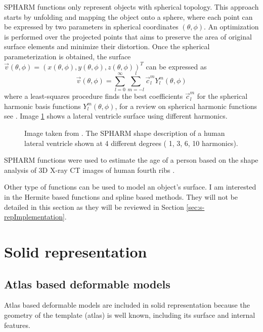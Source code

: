SPHARM functions only represent objects with spherical topology. 
This approach starts by unfolding and mapping the object onto a sphere, where each 
point can be expressed by two parameters in spherical coordinates $(\theta, \phi)$. 
An optimization is performed over the projected points that aims to preserve the area of original
surface elements and minimize their distortion. 
Once the spherical parameterization is obtained, 
the surface $\vec{v}(\theta, \phi) = (x(\theta, \phi), y(\theta, \phi), z(\theta, \phi))^T$
can be expressed as
\begin{equation}
 \vec{v}(\theta, \phi) = \sum_{l=0}^\infty \sum_{m=-l}^l \vec{c}_l^m Y_l^m(\theta, \phi)
 \label{equ:sphericalHarmonics}
\end{equation}
where a least-squares procedure 
finds the best coefficients $\vec{c}_l^m$ for the spherical harmonic basis functions $Y_l^m(\theta, \phi)$, 
for a review on spherical harmonic functions see \cite{mohlenkamp2010user}.
Image \ref{fig:spharm} shows a lateral ventricle surface using different harmonics.

\begin{figure} 
 \centering 
 \caption[SPHARM description.]{Image taken from \cite{styner2004boundary}. The SPHARM shape description of a human lateral ventricle 
	  shown at 4 different degrees ( 1, 3, 6, 10 harmonics).
}
 \label{fig:spharm}  
\end{figure}

SPHARM functions were used to estimate the age of a person based on the 
shape analysis of 3D X-ray CT images of human fourth ribs \cite{PRIET-12d}.

Other type of functions can be used to model an object's surface. I am interested in 
the Hermite based functions and spline based methods. They will not be detailed in this section
as they will be reviewed in Section \ref{sec:s-repImplementation}.


\section{Solid representation}
\label{sec:solidRep}

\subsection{Atlas based deformable models}
\label{sec:atlasDeform}

Atlas based deformable models are included in solid representation 
because the geometry of the template (atlas) is well known, 
including its surface and internal features. 

